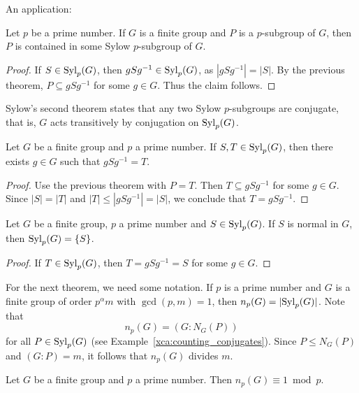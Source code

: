 An application:

\begin{corollary}
    Let $p$ be a prime number. 
    If $G$ is a finite group and 
    $P$ is a $p$-subgroup of $G$, then $P$ 
    is contained in some Sylow $p$-subgroup of $G$.
\end{corollary}

\begin{proof}
If $S\in\mathrm{Syl}_p(G)$, then $gSg^{-1}\in\mathrm{Syl}_p(G)$, as $|gSg^{-1}|=|S|$. 
By the previous theorem, 
$P\subseteq gSg^{-1}$ for some $g\in G$. Thus the claim follows. 
\end{proof}

Sylow's second theorem states 
that any two Sylow $p$-subgroups are conjugate, that 
is, $G$ acts transitively 
by conjugation on $\mathrm{Syl}_p(G)$. 

\begin{theorem}
\label{thm:Sylow2}
Let $G$ be a finite group and $p$ 
a prime number. If 
$S,T\in\mathrm{Syl}_p(G)$, then there exists 
$g\in G$ such that $gSg^{-1}=T$.
\end{theorem}

\begin{proof}
Use the previous theorem with $P=T$. Then
$T\subseteq gSg^{-1}$ for some $g\in G$. Since 
$|S|=|T|$ and 
$|T|\leq |gSg^{-1}|=|S|$, we conclude that
$T=gSg^{-1}$.
\end{proof}

\begin{corollary}
Let $G$ be a finite group, $p$ a prime number and
$S\in\mathrm{Syl}_p(G)$. If $S$ is normal in $G$, then 
$\mathrm{Syl}_p(G)=\{S\}$.
\end{corollary}

\begin{proof}
If $T\in\mathrm{Syl}_p(G)$, then $T=gSg^{-1}=S$ for some $g\in G$.
\end{proof}

For the next theorem, we need some notation. If $p$
is a prime number and $G$ is a finite group of order
$p^\alpha m$ with $\gcd(p,m)=1$, then
$n_p(G)=|\mathrm{Syl}_p(G)|$. Note that 
\[
n_p(G)=(G:N_G(P))
\]
for all $P\in\mathrm{Syl}_p(G)$ (see Example~\ref{xca:counting_conjugates}). 
Since $P\leq N_G(P)$ and $(G:P)=m$, it follows that
$n_p(G)$ divides $m$.

\begin{theorem}
\label{thm:Sylow3}
Let $G$ be a finite group and $p$ a prime number. 
Then $n_p(G)\equiv 1\bmod p$.
\end{theorem}

